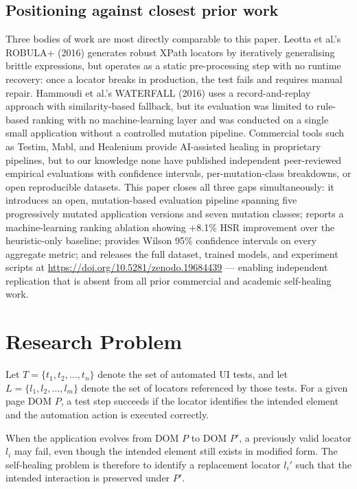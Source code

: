 \documentclass[conference]{IEEEtran}
\begin{document}
\subsection{Positioning against closest prior work}

Three bodies of work are most directly comparable to this paper. Leotta et al.'s ROBULA+ (2016) generates robust XPath locators by iteratively generalising brittle expressions, but operates as a static pre-processing step with no runtime recovery: once a locator breaks in production, the test fails and requires manual repair. Hammoudi et al.'s WATERFALL (2016) uses a record-and-replay approach with similarity-based fallback, but its evaluation was limited to rule-based ranking with no machine-learning layer and was conducted on a single small application without a controlled mutation pipeline. Commercial tools such as Testim, Mabl, and Healenium provide AI-assisted healing in proprietary pipelines, but to our knowledge none have published independent peer-reviewed empirical evaluations with confidence intervals, per-mutation-class breakdowns, or open reproducible datasets. This paper closes all three gaps simultaneously: it introduces an open, mutation-based evaluation pipeline spanning five progressively mutated application versions and seven mutation classes; reports a machine-learning ranking ablation showing +8.1\% HSR improvement over the heuristic-only baseline; provides Wilson 95\% confidence intervals on every aggregate metric; and releases the full dataset, trained models, and experiment scripts at \url{https://doi.org/10.5281/zenodo.19684439} — enabling independent replication that is absent from all prior commercial and academic self-healing work.

\section{Research Problem}
\label{sec:problem}
Let $T = \{t_1, t_2, \ldots, t_n\}$ denote the set of automated UI tests, and let $L = \{l_1, l_2, \ldots, l_m\}$ denote the set of locators referenced by those tests. For a given page DOM $P$, a test step succeeds if the locator identifies the intended element and the automation action is executed correctly.

When the application evolves from DOM $P$ to DOM $P'$, a previously valid locator $l_i$ may fail, even though the intended element still exists in modified form. The self-healing problem is therefore to identify a replacement locator $l_i'$ such that the intended interaction is preserved under $P'$.
\end{document}
